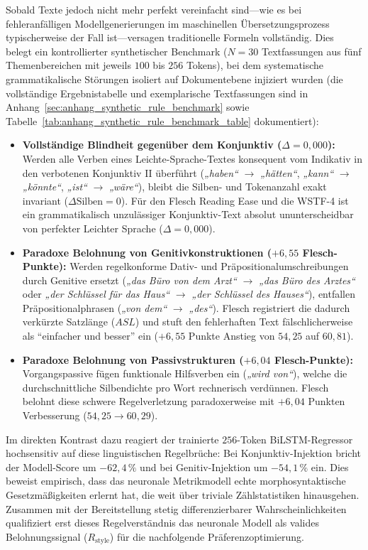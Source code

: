 Sobald Texte jedoch nicht mehr perfekt vereinfacht sind---wie es bei fehleranfälligen Modellgenerierungen im maschinellen Übersetzungsprozess typischerweise der Fall ist---versagen traditionelle Formeln vollständig. Dies belegt ein kontrollierter synthetischer Benchmark ($N = 30$ Textfassungen aus fünf Themenbereichen mit jeweils $100$ bis $256$ Tokens), bei dem systematische grammatikalische Störungen isoliert auf Dokumentebene injiziert wurden (die vollständige Ergebnistabelle und exemplarische Textfassungen sind in Anhang~\ref{sec:anhang_synthetic_rule_benchmark} sowie Tabelle~\ref{tab:anhang_synthetic_rule_benchmark_table} dokumentiert):
\begin{itemize}
    \item \textbf{Vollständige Blindheit gegenüber dem Konjunktiv ($\Delta = 0{,}000$):} Werden alle Verben eines Leichte-Sprache-Textes konsequent vom Indikativ in den verbotenen Konjunktiv II überführt (\textit{„haben“} $\rightarrow$ \textit{„hätten“}, \textit{„kann“} $\rightarrow$ \textit{„könnte“}, \textit{„ist“} $\rightarrow$ \textit{„wäre“}), bleibt die Silben- und Tokenanzahl exakt invariant ($\Delta \text{Silben} = 0$). Für den Flesch Reading Ease und die WSTF-4 ist ein grammatikalisch unzulässiger Konjunktiv-Text absolut ununterscheidbar von perfekter Leichter Sprache ($\Delta = 0{,}000$).
    \item \textbf{Paradoxe Belohnung von Genitivkonstruktionen ($+6{,}55$ Flesch-Punkte):} Werden regelkonforme Dativ- und Präpositionalumschreibungen durch Genitive ersetzt (\textit{„das Büro von dem Arzt“} $\rightarrow$ \textit{„das Büro des Arztes“} oder \textit{„der Schlüssel für das Haus“} $\rightarrow$ \textit{„der Schlüssel des Hauses“}), entfallen Präpositionalphrasen (\textit{„von dem“} $\rightarrow$ \textit{„des“}). Flesch registriert die dadurch verkürzte Satzlänge ($ASL$) und stuft den fehlerhaften Text fälschlicherweise als \enquote{einfacher und besser} ein ($+6{,}55$ Punkte Anstieg von $54{,}25$ auf $60{,}81$).
    \item \textbf{Paradoxe Belohnung von Passivstrukturen ($+6{,}04$ Flesch-Punkte):} Vorgangspassive fügen funktionale Hilfsverben ein (\textit{„wird von“}), welche die durchschnittliche Silbendichte pro Wort rechnerisch verdünnen. Flesch belohnt diese schwere Regelverletzung paradoxerweise mit $+6{,}04$ Punkten Verbesserung ($54{,}25 \rightarrow 60{,}29$).
\end{itemize}

Im direkten Kontrast dazu reagiert der trainierte $256$-Token BiLSTM-Regressor hochsensitiv auf diese linguistischen Regelbrüche: Bei Konjunktiv-Injektion bricht der Modell-Score um $-62{,}4\,\%$ und bei Genitiv-Injektion um $-54{,}1\,\%$ ein. Dies beweist empirisch, dass das neuronale Metrikmodell echte morphosyntaktische Gesetzmäßigkeiten erlernt hat, die weit über triviale Zählstatistiken hinausgehen. Zusammen mit der Bereitstellung stetig differenzierbarer Wahrscheinlichkeiten qualifiziert erst dieses Regelverständnis das neuronale Modell als valides Belohnungssignal ($R_{\text{style}}$) für die nachfolgende Präferenzoptimierung.

